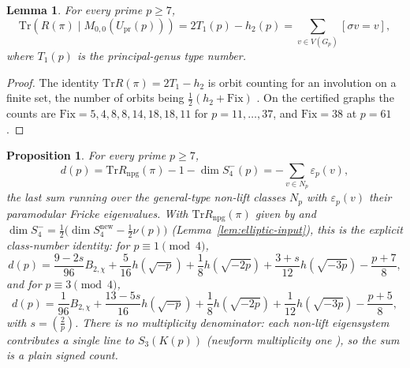 \documentclass[10pt,a4paper]{amsart}
\newtheorem{proposition}[theorem]{Proposition}
\newtheorem{lemma}[theorem]{Lemma}
\newcommand{\Tr}{\mathrm{Tr}}
\newcommand{\Upr}{U_{\mathrm{pr}}}
\newcommand{\snew}{S^{\mathrm{new}}}
\newcommand{\eps}{\varepsilon}
\providecommand{\kro}[2]{\left(\frac{#1}{#2}\right)}
\providecommand{\Upr}{U_{\mathrm{pr}}}
\providecommand{\snew}{S^{\mathrm{new}}}
\begin{document}
	\begin{lemma}\label{lem:fixed-point-trace}
		For every prime $p\ge7$,
		\begin{equation}\label{eq:fixtrace}
			\Tr\!\left(R(\pi)\mid M_{0,0}(\Upr(p))\right)
			=2T_1(p)-h_2(p)
			=\sum_{v\in V(G_p)}[\sigma v=v],
		\end{equation}
		where $T_1(p)$ is the principal-genus type number.
	\end{lemma}
	
	\begin{proof}
		The identity $\Tr R(\pi)=2T_1-h_2$ is orbit counting for an involution on
		a finite set, the number of orbits being $\frac12(h_2+\mathrm{Fix})$
		\cite[Thm.~2]{IbukiyamaKatsura}. On the certified graphs the counts are
		$\mathrm{Fix}=5,4,8,8,14,18,18,11$ for $p=11,\dots,37$, and
		$\mathrm{Fix}=38$ at $p=61$.
	\end{proof}
	
	\begin{proposition}	\label{prop:exactmass}
		For every prime $p\ge7$,
		\begin{equation}\label{eq:exactmass}
			d(p)=\Tr R_{\mathrm{npg}}(\pi)-1-\dim S_4^-(p)
			=-\!\!\sum_{v\in N_p}\!\!\eps_p(v),
		\end{equation}
		the last sum running over the general-type non-lift classes $N_p$ with
		$\eps_p(v)$ their paramodular Fricke eigenvalues. With
		$\Tr R_{\mathrm{npg}}(\pi)$ given by
		\cite[Thm.~5.2]{Ibukiyama2019quinary} and
		$\dim S_4^-=\tfrac12\bigl(\dim\snew_4-\tfrac12\nu(p)\bigr)$
		(Lemma~\ref{lem:elliptic-input}), this is the explicit class-number
		identity: for $p\equiv1\pmod4$,
		\[
		d(p)=\frac{9-2s}{96}B_{2,\chi}
		+\frac{5}{16}h(\sqrt{-p})
		+\frac18h(\sqrt{-2p})
		+\frac{3+s}{12}h(\sqrt{-3p})
		-\frac{p+7}{8},
		\]
		and for $p\equiv3\pmod4$,
		\[
		d(p)=\frac{1}{96}B_{2,\chi}
		+\frac{13-5s}{16}h(\sqrt{-p})
		+\frac18h(\sqrt{-2p})
		+\frac1{12}h(\sqrt{-3p})
		-\frac{p+5}{8},
		\]
		with $s=\kro{2}{p}$. There is no multiplicity denominator: each non-lift eigensystem contributes a single line to $S_3(K(p))$ (newform multiplicity one \cite[Prop.~10.1]{RoesnerWeissauer2021}), so the sum is a plain signed count.
	\end{proposition}
	
\end{document}
